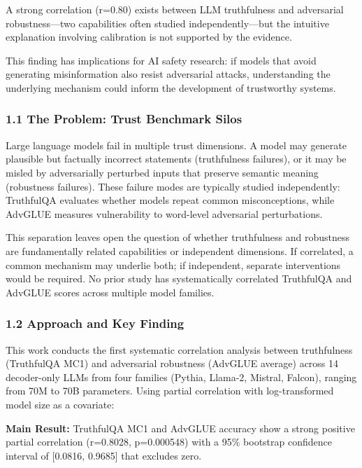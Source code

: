 
A strong correlation (r=0.80) exists between LLM truthfulness and adversarial robustness---two capabilities often studied independently---but the intuitive explanation involving calibration is not supported by the evidence.

This finding has implications for AI safety research: if models that avoid generating misinformation also resist adversarial attacks, understanding the underlying mechanism could inform the development of trustworthy systems.

\subsubsection{1.1 The Problem: Trust Benchmark Silos}

Large language models fail in multiple trust dimensions. A model may generate plausible but factually incorrect statements (truthfulness failures), or it may be misled by adversarially perturbed inputs that preserve semantic meaning (robustness failures). These failure modes are typically studied independently: TruthfulQA \citep{lin2022truthfulqa} evaluates whether models repeat common misconceptions, while AdvGLUE \citep{wang2022advglue} measures vulnerability to word-level adversarial perturbations.

This separation leaves open the question of whether truthfulness and robustness are fundamentally related capabilities or independent dimensions. If correlated, a common mechanism may underlie both; if independent, separate interventions would be required. No prior study has systematically correlated TruthfulQA and AdvGLUE scores across multiple model families.

\subsubsection{1.2 Approach and Key Finding}

This work conducts the first systematic correlation analysis between truthfulness (TruthfulQA MC1) and adversarial robustness (AdvGLUE average) across 14 decoder-only LLMs from four families (Pythia, Llama-2, Mistral, Falcon), ranging from 70M to 70B parameters. Using partial correlation with log-transformed model size as a covariate:

\textbf{Main Result:} TruthfulQA MC1 and AdvGLUE accuracy show a strong positive partial correlation (r=0.8028, p=0.000548) with a 95\% bootstrap confidence interval of [0.0816, 0.9685] that excludes zero.

